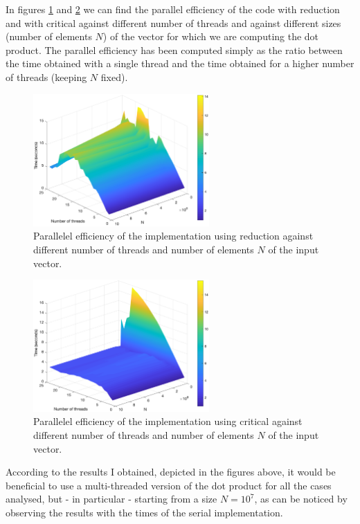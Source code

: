 \documentclass[unicode,11pt,a4paper,oneside,numbers=endperiod,openany]{scrartcl}
\begin{document}
In figures \ref{fig:reductionEff} and \ref{fig:criticalEff} we can find the parallel efficiency of the code with reduction and with critical against different number of threads and against different sizes (number of elements $N$) of the vector for which we are computing the dot product. The parallel efficiency has been computed simply as the ratio between the time obtained with a single thread and the time obtained for a higher number of threads (keeping $N$ fixed).

\begin{figure}[h!]
\centering
\includegraphics[width=0.6\textwidth]{Figures/surfPlot_rEff.eps}
\caption{Parallelel efficiency of the implementation using reduction against different number of threads and number of elements $N$ of the input vector.}\label{fig:reductionEff}
\end{figure}

\begin{figure}[h!]
\centering
\includegraphics[width=0.6\textwidth]{Figures/surfPlot_cEff.eps}
\caption{Parallelel efficiency of the implementation using critical against different number of threads and number of elements $N$ of the input vector.}\label{fig:criticalEff}
\end{figure}

According to the results I obtained, depicted in the figures above, it would be beneficial to use a multi-threaded version of the dot product for all the cases analysed, but - in particular - starting from a size $N=10^7$, as can be noticed by observing the results with the times of the serial implementation.
\end{document}
